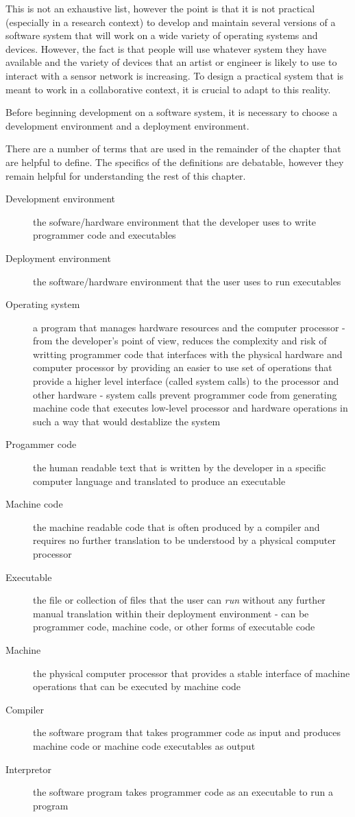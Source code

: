 This is not an exhaustive list, however the point is that it is not practical (especially in a research context) to develop and maintain several versions of a software system that will work on a wide variety of operating systems and devices. However, the fact is that people will use whatever system they have available and the variety of devices that an artist or engineer is likely to use to interact with a sensor network is increasing. To design a practical system that is meant to work in a collaborative context, it is crucial to adapt to this reality.

Before beginning development on a software system, it is necessary to choose a development environment and a deployment environment.

There are a number of terms that are used in the remainder of the chapter that are helpful to define. The specifics of the definitions are debatable, however they remain helpful for understanding the rest of this chapter.

\begin{description}
\item[Development environment] the sofware/hardware environment that the developer uses to write programmer code and executables
\item[Deployment environment] the software/hardware environment that the user uses to run executables
\item[Operating system] a program that manages hardware resources and the computer processor - from the developer's point of view, reduces the complexity and risk of writting programmer code that interfaces with the physical hardware and computer processor by providing an easier to use set of operations that provide a higher level interface (called system calls) to the processor and other hardware - system calls prevent programmer code from generating machine code that executes low-level processor and hardware operations in such a way that would destablize the system
\item[Progammer code] the human readable text that is written by the developer in a specific computer language and translated to produce an executable
\item[Machine code] the machine readable code that is often produced by a compiler and requires no further translation to be understood by a physical computer processor
\item[Executable] the file or collection of files that the user can \emph{run} without any further manual translation within their deployment environment - can be programmer code, machine code, or other forms of executable code  
\item[Machine] the physical computer processor that provides a stable interface of machine operations that can be executed by machine code
\item[Compiler] the software program that takes programmer code as input and produces machine code or machine code executables as output
\item[Interpretor] the software program takes programmer code as an executable to run a program
\end{description}

